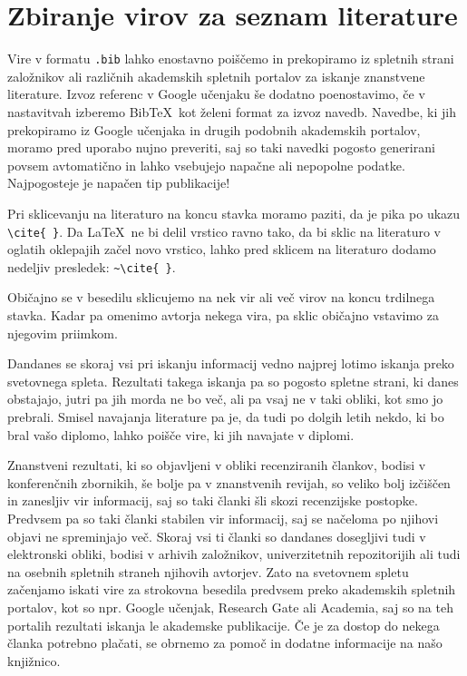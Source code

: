 \documentclass[a4paper,12pt,openright]{book}
\newcommand{\BibTeX}{{\sc Bib}\TeX}
\begin{document}
\section{Zbiranje virov za seznam literature}

Vire v formatu \texttt{.bib}  lahko enostavno poiščemo in prekopiramo iz spletnih strani založnikov ali različnih akademskih spletnih portalov za iskanje znanstvene literature.
Izvoz  referenc v Google učenjaku še dodatno poenostavimo, če v nastavitvah izberemo \BibTeX\ kot želeni format za izvoz navedb.
Navedbe, ki jih  prekopiramo iz Google učenjaka in drugih podobnih akademskih portalov, moramo pred uporabo nujno preveriti, saj so taki navedki pogosto generirani povsem avtomatično in lahko vsebujejo napačne ali nepopolne podatke.
Najpogosteje je napačen tip publikacije!

Pri sklicevanju na literaturo na koncu stavka moramo paziti, da je pika po ukazu \verb=\cite{ }=.
Da \LaTeX\ ne bi delil vrstico ravno tako, da bi sklic na literaturo v oglatih oklepajih začel novo vrstico, lahko pred sklicem na literaturo dodamo nedeljiv presledek: \verb=~\cite{ }=.

Običajno se v besedilu sklicujemo  na nek vir ali več virov na koncu trdilnega stavka.
Kadar pa omenimo avtorja nekega vira, pa sklic običajno vstavimo za njegovim priimkom.


Dandanes  se skoraj  vsi pri iskanju informacij vedno najprej lotimo iskanja preko svetovnega spleta.
Rezultati takega iskanja pa so pogosto spletne strani, ki danes obstajajo, jutri pa jih morda ne bo več, ali pa vsaj ne v taki obliki, kot smo jo prebrali.
Smisel navajanja literature pa je, da tudi po dolgih letih nekdo, ki bo bral vašo diplomo, lahko poišče vire, ki jih navajate v diplomi.

Znanstveni rezultati, ki so objavljeni v obliki recenziranih člankov, bodisi v konferenčnih zbornikih, še bolje pa v znanstvenih revijah, so veliko bolj izčiščen in zanesljiv vir informacij, saj
so taki članki šli skozi recenzijske postopke. Predvsem pa so taki članki stabilen vir informacij, saj se načeloma po njihovi objavi ne spreminjajo več.
Skoraj vsi ti članki so dandanes dosegljivi tudi v elektronski obliki, bodisi v arhivih založnikov, univerzitetnih repozitorijih ali tudi na osebnih spletnih straneh njihovih avtorjev.
Zato na svetovnem spletu začenjamo iskati vire za strokovna besedila predvsem preko akademskih spletnih portalov, kot so npr. Google učenjak, Research Gate ali Academia, saj so na teh portalih rezultati iskanja le akademske publikacije.
Če je za dostop do nekega članka potrebno plačati, se obrnemo za pomoč in dodatne informacije na  našo knjižnico.
\end{document}

